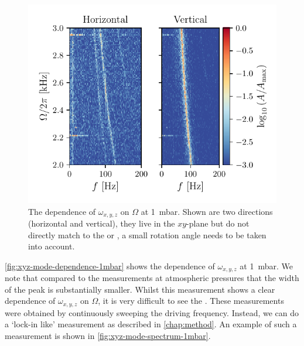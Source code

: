 \begin{figure}
    \centering
    \includegraphics{figures/data/xyz_mode_dependence_on_driving_frequency_spectrum.pdf}
    \caption{The dependence of $\omega_{x,y,z}$ on $\Omega$ at \qty{1}{\milli\bar}. Shown are two directions (horizontal and vertical), they live in the $xy$-plane but do not directly match to the \xmode or \ymode, a small rotation angle needs to be taken into account.}
    \label{fig:xyz-mode-dependence-1mbar}
\end{figure}

\autoref{fig:xyz-mode-dependence-1mbar} shows the dependence of $\omega_{x,y,z}$ at \qty{1}{\milli\bar}. We note that compared to the measurements at atmospheric pressures that the width of the peak is substantially smaller. Whilst this measurement shows a clear dependence of $\omega_{x,y,z}$ on $\Omega$, it is very difficult to see the \zmode. These measurements were obtained by continuously sweeping the driving frequency. Instead, we can do a `lock-in like' measurement as described in \autoref{chap:method}. An example of such a measurement is shown in \autoref{fig:xyz-mode-spectrum-1mbar}.

